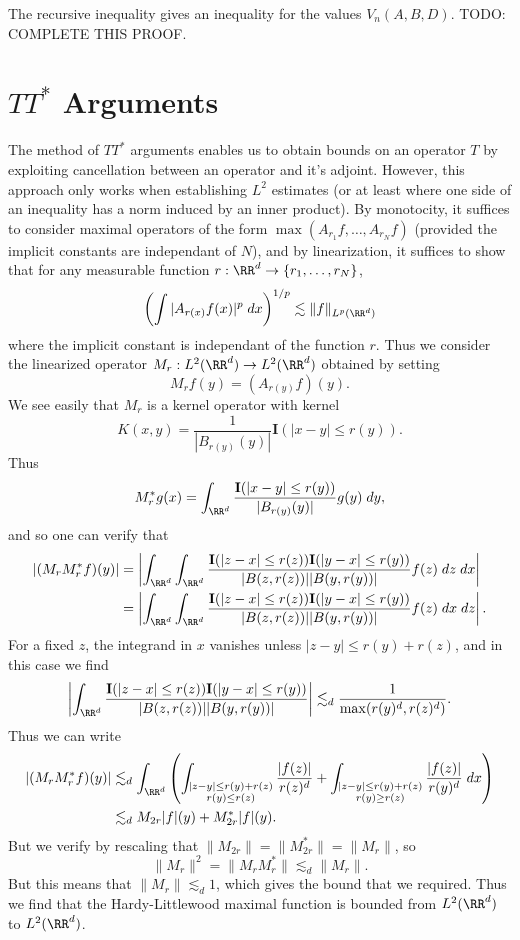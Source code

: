 The recursive inequality gives an inequality for the values $V_n(A,B,D)$. TODO: COMPLETE THIS PROOF.

\chapter{$TT^*$ Arguments}

The method of $TT^*$ arguments enables us to obtain bounds on an operator $T$ by exploiting cancellation between an operator and it's adjoint. However, this approach only works when establishing $L^2$ estimates (or at least where one side of an inequality has a norm induced by an inner product). By monotocity, it suffices to consider maximal operators of the form $\max(A_{r_1} f, \dots, A_{r_N} f)$ (provided the implicit constants are independant of $N$),  and by linearization, it suffices to show that for any measurable function $r: \RR^d \to \{ r_1, \dots, r_N \}$,
%
\[ \left( \int |A_{r(x)} f(x)|^p\; dx \right)^{1/p} \lesssim \| f \|_{L^p(\RR^d)} \]
%
where the implicit constant is independant of the function $r$. Thus we consider the linearized operator $M_r: L^2(\RR^d) \to L^2(\RR^d)$ obtained by setting
%
\[ M_r f(y) = (A_{r(y)} f)(y). \]
%
We see easily that $M_r$ is a kernel operator with kernel
%
\[ K(x,y) = \frac{1}{|B_{r(y)}(y)|} \mathbf{I}(|x - y| \leq r(y)). \]
%
Thus
%
\[ M_r^* g(x) = \int_{\RR^d} \frac{\mathbf{I}(|x - y| \leq r(y))}{|B_{r(y)}(y)|} g(y)\; dy, \]
%
and so one can verify that
%
\begin{align*}
  |(M_r M_r^* f)(y)| &= \left| \int_{\RR^d} \int_{\RR^d} \frac{\mathbf{I}(|z - x| \leq r(z)) \mathbf{I}(|y - x| \leq r(y))}{|B(z,r(z))| |B(y,r(y))|} f(z)\; dz\; dx \right|\\
  &= \left| \int_{\RR^d} \int_{\RR^d} \frac{\mathbf{I}(|z - x| \leq r(z)) \mathbf{I}(|y - x| \leq r(y))}{|B(z,r(z))| |B(y,r(y))|} f(z)\; dx\; dz \right|.
\end{align*}
%
For a fixed $z$, the integrand in $x$ vanishes unless $|z - y| \leq r(y) + r(z)$, and in this case we find
%
\[ \left| \int_{\RR^d} \frac{\mathbf{I}(|z - x| \leq r(z)) \mathbf{I}(|y - x| \leq r(y))}{|B(z,r(z))| |B(y,r(y))|} \right| \lesssim_d \frac{1}{\max(r(y)^d, r(z)^d)}. \]
%
Thus we can write
%
\begin{align*}
  |(M_r M_r^* f)(y)| &\lesssim_d \int_{\RR^d} \left( \int_{\substack{|z - y| \leq r(y) + r(z)\\r(y) \leq r(z)}} \frac{|f(z)|}{r(z)^d} + \int_{\substack{|z - y| \leq r(y) + r(z)\\r(y) \geq r(z)}} \frac{|f(z)|}{r(y)^d}\; dx \right)\\
  &\lesssim_d M_{2r}|f|(y) + M_{2r}^* |f|(y).
\end{align*}
%
But we verify by rescaling that $\| M_{2r} \| = \| M_{2r}^* \| = \| M_r \|$, so
%
\[ \| M_r \|^2 = \| M_r M_r^* \| \lesssim_d \| M_r \|. \]
%
But this means that $\| M_r \| \lesssim_d 1$, which gives the bound that we required. Thus we find that the Hardy-Littlewood maximal function is bounded from $L^2(\RR^d)$ to $L^2(\RR^d)$.






